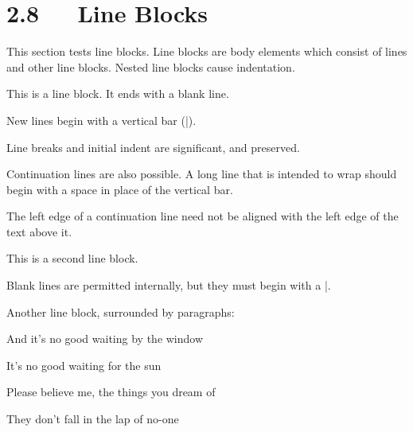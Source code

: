 \documentclass[a4paper]{memoir}
\newenvironment{DUlineblock}[1]{%
    \list{}{\setlength{\partopsep}{\parskip}
            \addtolength{\partopsep}{\baselineskip}
            \setlength{\topsep}{0pt}
            \setlength{\itemsep}{0.15\baselineskip}
            \setlength{\parsep}{0pt}
            \setlength{\leftmargin}{#1}}
    \raggedright
  }
  {\endlist}
\begin{document}
\section{2.8   Line Blocks%
  \label{line-blocks}%
}

This section tests line blocks.  Line blocks are body elements which
consist of lines and other line blocks.  Nested line blocks cause
indentation.

\begin{DUlineblock}{0em}
\item[] This is a line block.  It ends with a blank line.
\item[]
\begin{DUlineblock}{\DUlineblockindent}
\item[] New lines begin with a vertical bar (\textquotedbl{}|\textquotedbl{}).
\item[] Line breaks and initial indent are significant, and preserved.
\item[]
\begin{DUlineblock}{\DUlineblockindent}
\item[] Continuation lines are also possible.  A long line that is intended
to wrap should begin with a space in place of the vertical bar.
\end{DUlineblock}
\item[] The left edge of a continuation line need not be aligned with
the left edge of the text above it.
\end{DUlineblock}
\end{DUlineblock}

\begin{DUlineblock}{0em}
\item[] This is a second line block.
\item[] 
\item[] Blank lines are permitted internally, but they must begin with a \textquotedbl{}|\textquotedbl{}.
\end{DUlineblock}

Another line block, surrounded by paragraphs:

\begin{DUlineblock}{0em}
\item[] And it's no good waiting by the window
\item[] It's no good waiting for the sun
\item[] Please believe me, the things you dream of
\item[] They don't fall in the lap of no-one
\end{DUlineblock}
\end{document}
